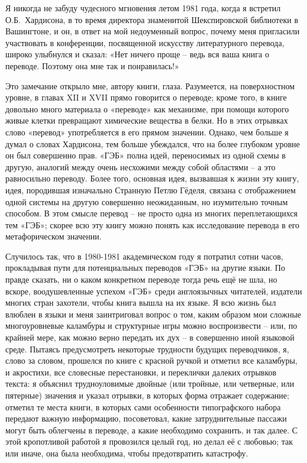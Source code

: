 \documentclass[../main.tex]{subfiles}
\begin{document}
Я никогда не забуду чудесного мгновения летом 1981 года, когда я встретил О.Б.~Хардисона, в то время директора знаменитой Шекспировской библиотеки в Вашингтоне, и он, в ответ на мой недоуменный вопрос, почему меня пригласили участвовать в конференции, посвященной искусству литературного перевода, широко улыбнулся и сказал: «Нет ничего проще \--- ведь вся ваша книга о переводе.
Поэтому она мне так и понравилась!»

Это замечание открыло мне, автору книги, глаза.
Разумеется, на поверхностном уровне, в главах XII и XVII прямо говорится о переводе; кроме того, в книге довольно много материала о «переводе» как механизме, при помощи которого живые клетки превращают химические вещества в белки.
Но в этих отрывках слово «перевод» употребляется в его прямом значении.
Однако, чем больше я думал о словах Хардисона, тем больше убеждался, что на более глубоком уровне он был совершенно прав.
«ГЭБ» полна идей, переносимых из одной схемы в другую, аналогий между очень несхожими между собой областями \--- а это равносильно переводу.
Более того, основная идея, вызвавшая к жизни эту книгу, идея, породившая изначально Странную Петлю Гёделя, связана с отображением одной системы на другую совершенно неожиданным, но изумительно точным способом.
В этом смысле перевод \--- не просто одна из многих переплетающихся тем «ГЭБ»; скорее всю эту книгу можно понять как исследование перевода в его метафорическом значении.

Случилось так, что в 1980-1981 академическом году я потратил сотни часов, прокладывая пути для потенциальных переводов «ГЭБ» на другие языки.
По правде сказать, ни о каком конкретном переводе тогда речь ещё не шла, но вскоре, воодушевленные успехом «ГЭБ» среди англоязычных читателей, издатели многих стран захотели, чтобы книга вышла на их языке.
Я всю жизнь был влюблен в языки и меня заинтриговал вопрос о том, каким образом мои сложные многоуровневые каламбуры и структурные игры можно воспроизвести \--- или, по крайней мере, как можно верно передать их дух \--- в совершенно иной языковой среде.
Пытаясь предусмотреть некоторые трудности будущих переводчиков, я, слово за словом, прошелся по книге с красной ручкой и отметил все каламбуры, и акростихи, все словесные перестановки, и переклички далеких отрывков текста: я объяснил трудноуловимые двойные (или тройные, или четверные, или пятерные) значения и указал отрывки, в которых форма отражает содержание; отметил те места книги, в которых сами особенности типографского набора передают важную информацию, посоветовал, какие затруднительные пассажи могут быть облегчены в переводе, а какие необходимо сохранить, и так далее.
С этой кропотливой работой я провозился целый год, но делал её с любовью; так или иначе, она была необходима, чтобы предотвратить катастрофу.
\end{document}

